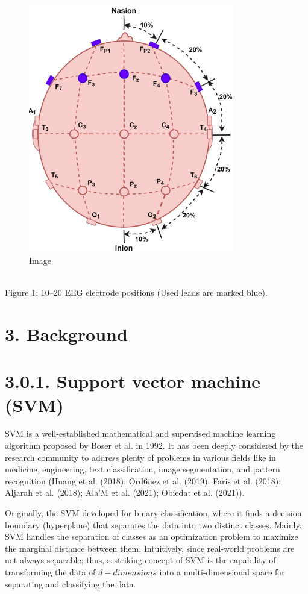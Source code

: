 \documentclass{article}
\begin{document}
\begin{figure}[htbp]
\centering
\includegraphics[width=0.8\textwidth]{images/b92d712fcf89518a10c69122e1cfe2f27d2373e33993274427d2dc4380668c54.jpg}
\caption{Image}
\end{figure}

\\
Figure 1: 10–20 EEG electrode positions (Used leads are marked blue).


\section{3. Background}

\section{3.0.1. Support vector machine (SVM)}

SVM is a well-established mathematical and supervised machine learning algorithm proposed by Boser et al. in 1992. It has been deeply considered by the research community to address plenty of problems in various fields like in medicine, engineering, text classification, image segmentation, and pattern recognition (Huang et al. (2018); Ord6nez et al. (2019); Faris et al. (2018); Aljarah et al. (2018); Ala’M et al. (2021); Obiedat et al. (2021)).


Originally, the SVM developed for binary classification, where it finds a decision boundary (hyperplane) that separates the data into two distinct classes. Mainly, SVM handles the separation of classes as an optimization problem to maximize the marginal distance between them. Intuitively, since real-world problems are not always separable; thus, a striking concept of SVM is the capability of transforming the data of $d-d i m e n s i o n s$ into a multi-dimensional space for separating and classifying the data.
\end{document}
